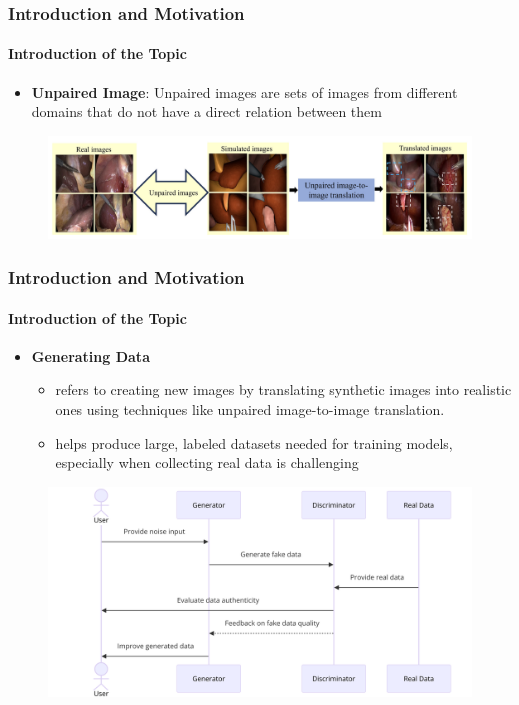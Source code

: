 \documentclass[aspectratio=169, lecture, amberg]{OTHAWbeamer}
\begin{document}
  \begin{frame}
    \frametitle{Introduction and Motivation}
    \framesubtitle{Introduction of the Topic}
    
    \begin{itemize}
        \item \textbf{Unpaired Image}: Unpaired images are sets of images from different domains that do not have a direct relation between them
    \end{itemize}
    
    \begin{figure}
        \centering
        \includegraphics[width=0.9\linewidth]{unpaired.png}
        
    \end{figure}
    
\end{frame}



  \begin{frame}
    \frametitle{Introduction and Motivation}
    \framesubtitle{Introduction of the Topic}
    \begin{itemize}
         \item \textbf{Generating Data}
         \begin{itemize}
            \item refers to creating new images by translating synthetic images into realistic ones using techniques like unpaired image-to-image translation.
            \item helps produce large, labeled datasets needed for training models, especially when collecting real data is challenging
         \end{itemize}

    \end{itemize}
    \begin{figure}
        \centering
        \includegraphics[width=0.55\linewidth]{diagram.png} %
    \end{figure}
  \end{frame}
\end{document}
